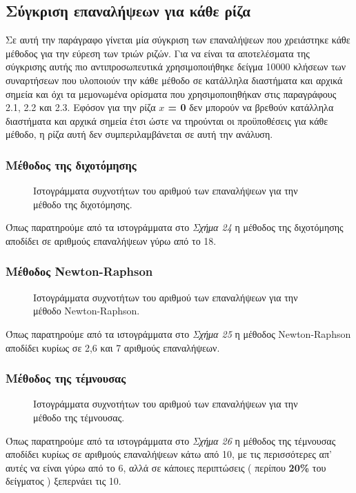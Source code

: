 \documentclass[First Project.tex]{subfiles}
\begin{document}
\subsection{ Σύγκριση επαναλήψεων για κάθε ρίζα }
Σε αυτή την παράγραφο γίνεται μία σύγκριση των επαναλήψεων που χρειάστηκε κάθε μέθοδος για την εύρεση των
τριών ριζών. Για  να είναι τα αποτελέσματα της σύγκρισης αυτής πιο αντιπροσωπευτικά χρησιμοποιήθηκε δείγμα 10000 κλήσεων των συναρτήσεων που υλοποιούν την κάθε μέθοδο
σε κατάλληλα διαστήματα και αρχικά σημεία και όχι τα μεμονωμένα ορίσματα που χρησιμοποιηθήκαν στις παραγράφους 2.1, 2.2 και 2.3. Εφόσον για την ρίζα \textlatin{\textbf{$x$ = 0}} δεν μπορούν να βρεθούν κατάλληλα διαστήματα
και αρχικά σημεία έτσι ώστε να τηρούνται οι προϋποθέσεις για κάθε μέθοδο, η ρίζα αυτή δεν συμπεριλαμβάνεται σε αυτή την ανάλυση.
\subsubsection{\textbf{Μέθοδος της διχοτόμησης}}
\vspace{5mm}
\begin{figure}[h!]
    \centering
    \quad
    \caption{ Ιστογράμματα συχνοτήτων του αριθμού των επαναλήψεων για την μέθοδο της διχοτόμησης. }
\end{figure}
Όπως παρατηρούμε από τα ιστογράμματα στο \textit{Σχήμα 24} η μέθοδος της διχοτόμησης αποδίδει σε αριθμούς επαναλήψεων γύρω από το 18.
\subsubsection{\textbf{Μέθοδος \textlatin{Newton-Raphson}}}
\vspace{5mm}
\begin{figure}[h!]
    \centering
    \quad
    \caption{ Ιστογράμματα συχνοτήτων του αριθμού των επαναλήψεων για την μέθοδο \textlatin{Newton-Raphson}. }
\end{figure}
Όπως παρατηρούμε από τα ιστογράμματα στο \textit{Σχήμα 25} η μέθοδος \textlatin{Newton-Raphson} αποδίδει κυρίως σε 2,6 και
7 αριθμούς επαναλήψεων.
\newpage
\subsubsection{\textbf{Μέθοδος της τέμνουσας}}
\begin{figure}[h!]
    \centering
    \quad
    \caption{ Ιστογράμματα συχνοτήτων του αριθμού των επαναλήψεων για την μέθοδο της τέμνουσας. }
\end{figure}
Όπως παρατηρούμε από τα ιστογράμματα στο \textit{Σχήμα 26} η μέθοδος της τέμνουσας αποδίδει κυρίως σε αριθμούς επαναλήψεων κάτω από 10, με τις
περισσότερες απ' αυτές να είναι γύρω από το 6, αλλά σε κάποιες περιπτώσεις ( περίπου \textbf{20\%} του δείγματος ) ξεπερνάει τις 10.
\end{document}
